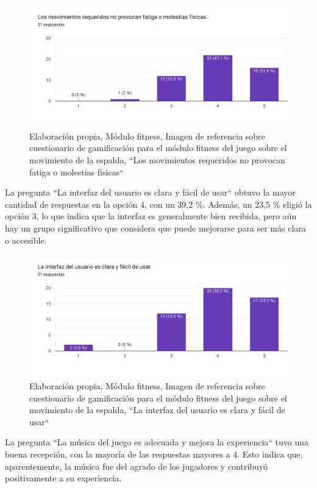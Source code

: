\begin{figure}[H]
  \centering
  \includegraphics[width=0.7\linewidth]{Imagenes/fd5.png}
  \caption{Elaboración propia, Módulo fitness, Imagen de referencia sobre cuestionario de gamificación para el módulo fitness del juego sobre el movimiento de la espalda, ``Los movimientos requeridos no provocan fatiga o molestias físicas``}
  \label{fig:cuestionario16fitness}
\end{figure}


La pregunta ``La interfaz del usuario es clara y fácil de usar`` obtuvo la mayor cantidad de respuestas en la opción 4, con un 39,2 \%. Además, un 23,5 \% eligió la opción 3, lo que indica que la interfaz es generalmente bien recibida, pero aún hay un grupo significativo que considera que puede mejorarse para ser más clara o accesible.

\begin{figure}[H]
  \centering
  \includegraphics[width=0.7\linewidth]{Imagenes/fd6.png}
  \caption{Elaboración propia, Módulo fitness, Imagen de referencia sobre cuestionario de gamificación para el módulo fitness del juego sobre el movimiento de la espalda, ``La interfaz del usuario es clara y fácil de usar``}
  \label{fig:cuestionario17fitness}
\end{figure}

La pregunta ``La música del juego es adecuada y mejora la experiencia`` tuvo una buena recepción, con la mayoría de las respuestas mayores a 4. Esto indica que, aparentemente, la música fue del agrado de los jugadores y contribuyó positivamente a su experiencia.

